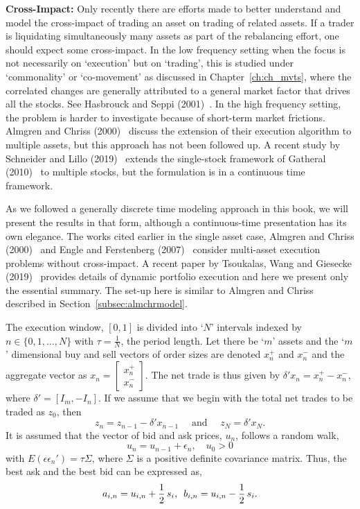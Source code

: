 \noindent\textbf{Cross-Impact:} Only recently there are efforts made to better understand and model the cross-impact of trading an asset on trading of related assets. If a trader is liquidating simultaneously many assets as part of the rebalancing effort, one should expect some cross-impact. In the low frequency setting when the focus is not necessarily on `execution' but on `trading', this is studied under `commonality' or `co-movement' as discussed in Chapter~\ref{ch:ch_mvts}, where the correlated changes are generally attributed to a general market factor that drives all the stocks. See Hasbrouck and Seppi (2001)~\cite{seppi2001}. In the high frequency setting, the problem is harder to investigate because of short-term market frictions. Almgren and Chriss (2000)~\cite{alm2000} discuss the extension of their execution algorithm to multiple assets, but this approach has not been followed up. A recent study by Schneider and Lillo (2019)~\cite{schnlillo19} extends the single-stock framework of Gatheral (2010)~\cite{gatheral} to multiple stocks, but the formulation is in a continuous time framework.


As we followed a generally discrete time modeling approach in this book, we will present the results in that form, although a continuous-time presentation has its own elegance. The works cited earlier in the single asset case, Almgren and Chriss (2000)~\cite{alm2000} and Engle and Ferstenberg (2007)~\cite{engle2007} consider multi-asset execution problems without cross-impact. A recent paper by Tsoukalas, Wang and Giesecke (2019)~\cite{giesecke} provides details of dynamic portfolio execution and here we present only the essential summary. The set-up here is similar to Almgren and Chriss described in Section~\ref{subsec:almchrmodel}.


The execution window, $[0,1]$ is divided into `$N$' intervals indexed by $n \in \{0,1,\ldots,N\}$ with $\tau=\frac{1}{N}$, the period length. Let there be `$m$' assets and the `$m$' dimensional buy and sell vectors of order sizes are denoted $x_n^+$ and $x_n^-$ and the aggregate vector as $x_n= \begin{bmatrix} x_n^+ \\ x_n^- \end{bmatrix}$. The net trade is thus given by $\delta' x_n = x_n^+ - x_n^-$, where $\delta'= [I_m, -I_n]$. If we assume that we begin with the total net trades to be traded as $z_0$, then
	\begin{equation}
	z_n = z_{n-1} - \delta' x_{n-1} \quad \text{ and } \quad z_N= \delta' x_N.
	\end{equation}
It is assumed that the vector of bid and ask prices, $u_n$, follows a random walk,
	\begin{equation}
	u_n= u_{n-1} + \epsilon_n, \quad u_0 > 0
	\end{equation}
with $E(\epsilon \epsilon_n')= \tau \Sigma$, where $\Sigma$ is a positive definite covariance matrix. Thus, the best ask and the best bid can be expressed as,
	\begin{equation}
	a_{i,n} = u_{i,n} + \frac{1}{2} \, s_i, \enskip b_{i,n} = u_{i,n} - \frac{1}{2}\, s_i.
	\end{equation}


